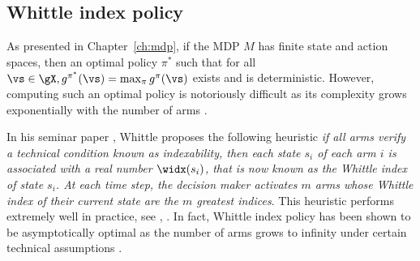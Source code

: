 
\subsection{Whittle index policy}
\label{subsec:whittle_idx}

As presented in Chapter~\ref{ch:mdp}, if the MDP $M$ has finite state and action spaces, then an optimal policy $\pi^*$ such that for all $\vs\in\gX, g^{\pi^*}(\vs)=\max_{\pi}g^{\pi}(\vs)$ exists and is deterministic.
However, computing such an optimal policy is notoriously difficult as its complexity grows exponentially with the number of arms \cite{papadimitriou1994complexity}.

In his seminar paper \cite{whittle1988restless}, Whittle proposes the following heuristic \textit{if all arms verify a technical condition known as indexability, then each state $s_i$ of each arm $i$ is associated with a real number $\widx(s_i)$, that is now known as the Whittle index of state $s_i$.
At each time step, the decision maker activates $m$ arms whose Whittle index of their current state are the $m$ greatest indices}.
This heuristic performs extremely well in practice, see \eg, \cite{glazebrook2006some, ansell2003whittle, glazebrook2002index}.
In fact, Whittle index policy has been shown to be asymptotically optimal as the number of arms grows to infinity under certain technical assumptions \cite{verloop2016asymptotically, lott2000optimality, weber1990index}.

